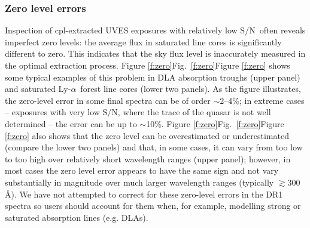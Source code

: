 \documentclass[fleqn,usenatbib,usedcolumn]{mnras}
\renewcommand{\la}{\lesssim} %
\renewcommand{\ga}{\gtrsim} %
\newcommand{\Fref}[1]{\ifhmode \ifnum\spacefactor=1001 Figure \ref{#1}\else Fig.\ \ref{#1}\fi \else Figure \ref{#1}\fi}
\newcommand{\SN}{\ensuremath{\textrm{S/N}}}
\newcommand{\lya}{\ensuremath{\textrm{Ly-}\alpha}}
\begin{document}
\subsubsection{Zero level errors}\label{sss:zero}

Inspection of {\sc cpl}-extracted UVES exposures with relatively low \SN\ often reveals imperfect zero levels: the average flux in saturated line cores is significantly different to zero. This indicates that the sky flux level is inaccurately measured in the optimal extraction process. \Fref{f:zero} shows some typical examples of this problem in DLA absorption troughs (upper panel) and saturated \lya\ forest line cores (lower two panels). As the figure illustrates, the zero-level error in some final spectra can be of order $\sim$2--4\%; in extreme cases -- exposures with very low \SN, where the trace of the quasar is not well determined -- the error can be up to $\sim$10\%. \Fref{f:zero} also shows that the zero level can be overestimated or underestimated (compare the lower two panels) and that, in some cases, it can vary from too low to too high over relatively short wavelength ranges (upper panel); however, in most cases the zero level error appears to have the same sign and not vary substantially in magnitude over much larger wavelength ranges (typically $\ga$300\,\AA). We have not attempted to correct for these zero-level errors in the DR1 spectra so users should account for them when, for example, modelling strong or saturated absorption lines (e.g. DLAs).
\end{document}
